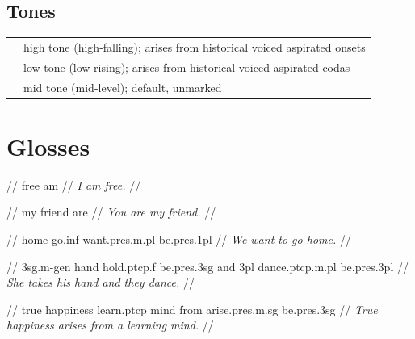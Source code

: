 \documentclass{article}
\begin{document}
\subsection{Tones}

\begin{xltabular}{\textwidth}{lL}
   & high tone (high-falling); arises from historical voiced aspirated onsets \\
   & low tone (low-rising); arises from historical voiced aspirated codas \\
   & mid tone (mid-level); default, unmarked \\
\end{xltabular}

\newpage\section{Glosses}

\ex
\begingl
\gla {}   //
 free am //
\glft \textit{I am free.} //
\endgl
\xe

\ex
\begingl
\gla {}   \ipa{\~\ae:} //
 my friend are //
\glft \textit{You are my friend.} //
\endgl
\xe

\ex
\begingl
\gla {}     //
 home go.{\sc inf} want.{\sc pres.m.pl} be.{\sc pres.1pl} //
\glft \textit{We want to go home.} //
\endgl
\xe

\ex
\begingl
\gla {}         //
 {\sc 3sg.m}-{\sc gen} hand hold.{\sc ptcp.f} be.{\sc pres.3sg} and {\sc 3pl} dance.{\sc ptcp.m.pl} be.{\sc pres.3pl} //
\glft \textit{She takes his hand and they dance.} //
\endgl
\xe

\ex
\begingl
\gla {}       //
\glb true happiness learn.{\sc ptcp} mind from arise.{\sc pres.m.sg} be.{\sc pres.3sg} //
\glft \textit{True happiness arises from a learning mind.} //
\endgl
\xe
\end{document}
